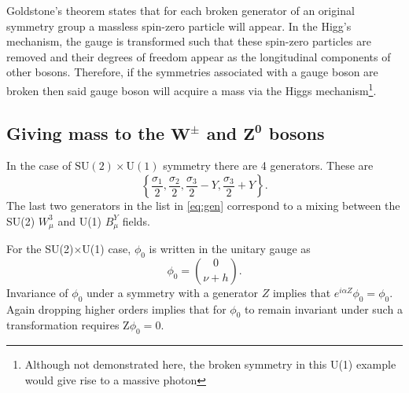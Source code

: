 
Goldstone's theorem states that for each broken generator of an original symmetry group a massless spin-zero particle will appear. In the Higg's mechanism, the gauge is transformed such that these spin-zero particles are removed and their degrees of freedom appear as the longitudinal components of other bosons. Therefore, if the symmetries associated with a gauge boson are broken then said gauge boson will acquire a mass via the Higgs mechanism\footnote{Although not demonstrated here, the broken symmetry in this U(1) example would give rise to a massive photon}. 
\subsection[Giving mass to the $W^{\pm}$ and $Z^{0}$ bosons]{Giving mass to the $\mathbold{W^{\pm}}$ and $\mathbold{Z^{0}}$ bosons}
In the case of $\mathrm{SU(2)\times U(1)}$ symmetry  there are 4 generators. These are
\begin{equation}
  \left\{\frac{\sigma_{1}}{2},\frac{\sigma_{2}}{2}, \frac{\sigma_{3}}{2} - Y, \frac{\sigma_{3}}{2} +Y\right\}.
  \label{eq:gen}
\end{equation}
  The last two generators in the list in \autoref{eq:gen} correspond to a mixing between the SU(2) $W^{3}_{\mu}$ and U(1) $B^{Y}_{\mu}$ fields. %

  For the SU(2)$\times$U(1) case, $\phi_{0}$ is written in the unitary gauge as
\begin{equation}
\phi_{0} = \binom{0}{\nu +h}.
  \end{equation}
Invariance of $\phi_{0}$  under a symmetry with a generator $Z$ implies that $e^{i\alpha Z}\phi_{0} = \phi_{0}$.  Again dropping higher orders implies that for $\phi_{0}$ to remain invariant under such a transformation requires Z$\phi_{0} = 0$.

